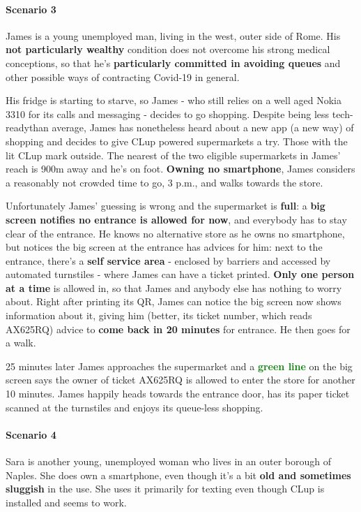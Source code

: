 \paragraph{Scenario 3}
James is a young unemployed man, living in the west, outer side of Rome. His \textbf{not particularly wealthy} condition does not overcome his strong medical conceptions, so that he's \textbf{particularly committed in avoiding queues} and other possible ways of contracting Covid-19 in general.

His fridge is starting to starve, so James - who still relies on a well aged Nokia 3310 for its calls and messaging - decides to go shopping. Despite being \guillemotleft less tech-ready\guillemotright \space than average, James has nonetheless heard about a new app (a new way) of shopping and decides to give CLup powered supermarkets a try. Those with the lit CLup mark outside.
\newline The nearest of the two eligible supermarkets in James' reach is 900m away and he's on foot. \textbf{Owning no smartphone}, James considers a reasonably not crowded time to go, 3 p.m., and walks towards the store. 

Unfortunately James' guessing is wrong and the supermarket is \textbf{full}: a \textbf{big screen notifies no entrance is allowed for now}, and everybody has to stay clear of the entrance. He knows no alternative store as he owns no smartphone, but notices the big screen at the entrance has advices for him: next to the entrance, there's a \textbf{self service area} - enclosed by barriers and accessed by automated turnstiles - where James can have a ticket printed. \textbf{Only one person at a time} is allowed in, so that James and anybody else has nothing to worry about.
\newline Right after printing its QR, James can notice the big screen now shows information about it, giving him (better, its ticket number, which reads AX625RQ) advice to \textbf{come back in 20 minutes} for entrance. He then goes for a walk.

25 minutes later James approaches the supermarket and a \textbf{\textcolor{green} {green line}} on the big screen says the owner of ticket AX625RQ is allowed to enter the store for another 10 minutes. 
\newline James happily heads towards the entrance door, has its paper ticket scanned at the turnstiles and enjoys its queue-less shopping.

\paragraph{Scenario 4}
Sara is another young, unemployed woman who lives in an outer borough of Naples. She does own a smartphone, even though it's a bit \textbf{old and sometimes sluggish} in the use. She uses it primarily for texting even though CLup is installed and seems to work.

